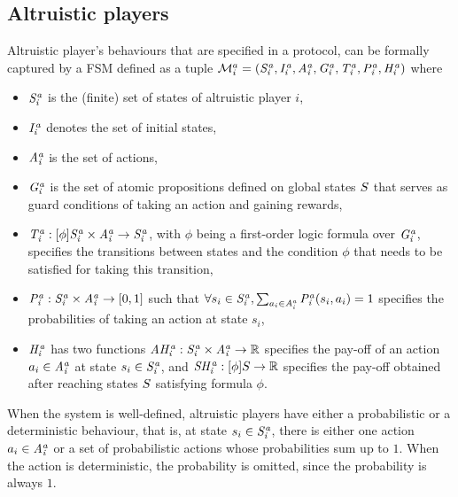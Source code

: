 \subsection{Altruistic players}\label{ssec:al}
Altruistic player's behaviours that are specified in a protocol, can be formally captured by a FSM defined as a tuple $\mathcal{M}^a_i=(\mathit{S^a_i}, \mathit{I^a_i}, \mathit{A^a_i}, \mathit{G^a_i}, \mathit{T^a_i}, \mathit{P^a_i}, \mathit{H^a_i})$ where 
\begin{itemize}
\item $\mathit{S^a_i}$ is the (finite) set of states of altruistic player $i$, 
\item $\mathit{I^a_i}$ denotes the set of initial states, 
\item $\mathit{A^a_i}$ is the set of actions, 
\item $\mathit{G^a_i}$ is the set of atomic propositions defined on global states $S$ that serves as guard conditions of taking an action and gaining rewards,
\item $\mathit{T^a_i}: [\phi] \mathit{S^a_i} \times \mathit{A^a_i}  \rightarrow \mathit{S^a_i}$, with $\phi$ being a first-order logic formula over $\mathit{G^a_i}$, specifies the transitions between states and the condition $\phi$ that needs to be satisfied for taking this transition,
\item $\mathit{P^a_i}: \mathit{S^a_i} \times \mathit{A^a_i} \rightarrow [0, 1]$ such that $\forall s_i\in \mathit{S^a_i}, \sum_{a_i\in \mathit{A^a_i}} \mathit{P^a_i}(s_i, a_i)=1$ specifies the probabilities of taking an action at state $s_i$,
\item $\mathit{H^a_i}$ has two functions $\mathit{AH^a_i}: \mathit{S^a_i} \times \mathit{A^a_i} \rightarrow \mathbb{R}$ specifies the pay-off of an action $a_i\in \mathit{A^a_i}$ at state $s_i\in \mathit{S^a_i}$, and $\mathit{SH^a_i}: [\phi]S \rightarrow \mathbb{R}$ specifies the pay-off obtained after reaching states $S$ satisfying formula $\phi$.
\end{itemize}
%
When the system is well-defined, altruistic players have either a probabilistic or a deterministic behaviour, that is, at state $s_i\in \mathit{S^a_i}$, there is either one action $a_i\in \mathit{A^a_i}$ or a set of probabilistic actions whose probabilities sum up to $1$. When the action is deterministic, the probability is omitted, since the probability is always $1$.

